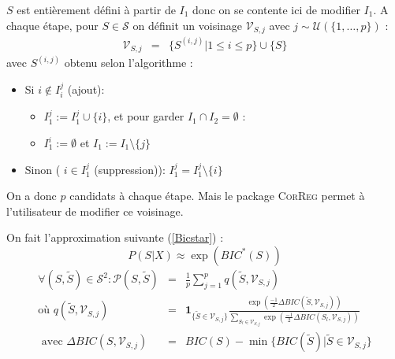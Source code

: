 \documentclass[12pt]{article}
\begin{document}
	$S$ est entièrement défini à partir de $I_1$ donc on se contente ici de modifier $I_1$. %
	A chaque étape, pour $S \in \mathcal{S}$ on définit un voisinage $\mathcal{V}_{S,j}$ avec $j \sim \mathcal{U}(\{1,\dots,p\}) $ :%
	\begin{eqnarray}
		\mathcal{V}_{S,j}&=&\{ S^{(i,j)} | 1\leq i\leq p \} \cup\{S \}
	\end{eqnarray}	
	avec $S^{(i,j)}$ obtenu selon l'algorithme :
	\begin{itemize}
		\item Si $i \notin I_i^j$ (ajout): 
			\begin{itemize}
				\item $I_1^j :=I_1^j\cup \{i\}$, et pour garder $I_1\cap I_2=\emptyset$ :
				\item $I_1^i :=\emptyset$ et $I_1:=I_1 \setminus \{j\}$
			\end{itemize}			 
		\item Sinon ( $i \in I_1^j$ (suppression)): $I_1^j=I_1^j\setminus \{i\}$
	\end{itemize}
	
	On a donc $p$ candidats à chaque étape. Mais le package \textsc{CorReg} permet à l'utilisateur de modifier ce voisinage.
	
		
	On fait l'approximation suivante  (\ref{Bicstar}) : 
	\begin{equation}
		P(S|X)\approx \exp(BIC^*(S))
	\end{equation}
	\begin{eqnarray}
			\forall (S,\tilde{S}) \in \mathcal{S}^2 : \mathcal{P}(S,\tilde{S})&=& \frac{1}{p} \sum_{j=1}^p q(\tilde{S},\mathcal{V}_{S,j}) \\
	\textrm{où }	q(\tilde{S},\mathcal{V}_{S,j})&=&\mathbf{1}_{ \{\tilde{S}\in \mathcal{V}_{S,j}\} }\frac{\exp(\frac{-1}{2}\Delta BIC(\tilde{S},\mathcal{V}_{S,j}))}{\sum_{S_l\in \mathcal{V}_{S,j}}\exp(\frac{-1}{2}\Delta BIC(S_l,\mathcal{V}_{S,j}))} \\
	\textrm{ avec } \Delta BIC(S,\mathcal{V}_{S,j})&=&BIC(S)-\min\{BIC(\tilde{S})| \tilde{S} \in \mathcal{V}_{S,j} \}
	\end{eqnarray}
	
\end{document}
